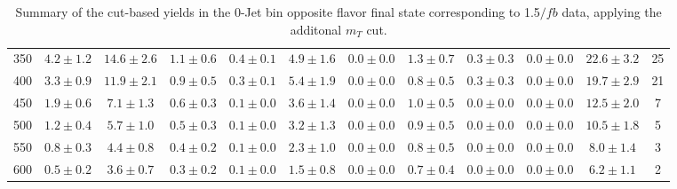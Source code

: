 \begin{table}
{\begin{center}
\begin{tabular}{l c c c c c c c c c c c }
350 & $4.2\pm1.2$ & $14.6\pm2.6$ & $1.1\pm0.6$ & $0.4\pm0.1$ & $4.9\pm1.6$ & $0.0\pm0.0$ & $1.3\pm0.7$ & $0.3\pm0.3$ & $0.0\pm0.0$ & $22.6\pm3.2$ & 25 \\
400 & $3.3\pm0.9$ & $11.9\pm2.1$ & $0.9\pm0.5$ & $0.3\pm0.1$ & $5.4\pm1.9$ & $0.0\pm0.0$ & $0.8\pm0.5$ & $0.3\pm0.3$ & $0.0\pm0.0$ & $19.7\pm2.9$ & 21 \\
450 & $1.9\pm0.6$ & $7.1\pm1.3$ & $0.6\pm0.3$ & $0.1\pm0.0$ & $3.6\pm1.4$ & $0.0\pm0.0$ & $1.0\pm0.5$ & $0.0\pm0.0$ & $0.0\pm0.0$ & $12.5\pm2.0$ & 7 \\
500 & $1.2\pm0.4$ & $5.7\pm1.0$ & $0.5\pm0.3$ & $0.1\pm0.0$ & $3.2\pm1.3$ & $0.0\pm0.0$ & $0.9\pm0.5$ & $0.0\pm0.0$ & $0.0\pm0.0$ & $10.5\pm1.8$ & 5 \\
550 & $0.8\pm0.3$ & $4.4\pm0.8$ & $0.4\pm0.2$ & $0.1\pm0.0$ & $2.3\pm1.0$ & $0.0\pm0.0$ & $0.8\pm0.5$ & $0.0\pm0.0$ & $0.0\pm0.0$ & $8.0\pm1.4$ & 3 \\
600 & $0.5\pm0.2$ & $3.6\pm0.7$ & $0.3\pm0.2$ & $0.1\pm0.0$ & $1.5\pm0.8$ & $0.0\pm0.0$ & $0.7\pm0.4$ & $0.0\pm0.0$ & $0.0\pm0.0$ & $6.2\pm1.1$ & 2 \\
\hline
\end{tabular}
\end{center}
}
\caption{Summary of the cut-based yields in the 0-Jet bin opposite flavor final state corresponding to 1.5$/fb$ data, applying the additonal $m_T$ cut.}
\end{table}
